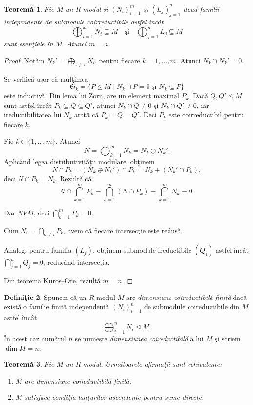 \documentclass[12pt,a4paper]{book}
\newcommand{\ess}{\trianglelefteq}  %
\theoremstyle{plain}
\newtheorem{theorem}{Teoremă}[section] %
\theoremstyle{definition}
\newtheorem{definition}[theorem]{Definiţie}
\theoremstyle{remark}
\begin{document}
\begin{theorem}
Fie \(M\) un \(R\)-modul şi \((N_i)_{i=1}^m\) şi \((L_j)_{j=1}^n\) două familii
independente de submodule coirreductibile astfel încât
\[
\bigoplus_{i=1}^m N_i \subseteq M
\quad\text{şi}\quad
\bigoplus_{j=1}^n L_j \subseteq M
\]
sunt esenţiale în \(M\).  
Atunci \(m = n\).
\end{theorem}

\begin{proof}
Notăm \(N_k' = \bigoplus_{i\ne k} N_i\), pentru fiecare \(k=1,\dots,m\).
Atunci \(N_k \cap N_k' = 0\).

Se verifică uşor că mulţimea
\[
\mathfrak{S}_k = \{P \le M \mid N_k \cap P = 0 \text{ şi } N_k \subseteq P\}
\]
este inductivă. Din lema lui Zorn, are un element maximal \(P_k\).
Dacă \(Q,Q' \le M\) sunt astfel încât \(P_k \subseteq Q \subseteq Q'\),
atunci \(N_k \cap Q \ne 0\) şi \(N_k \cap Q' \ne 0\),
iar ireductibilitatea lui \(N_k\) arată că \(P_k = Q = Q'\).
Deci \(P_k\) este coirreductibil pentru fiecare \(k\).

Fie \(k\in\{1,\dots,m\}\).
Atunci
\[
N = \bigoplus_{k=1}^m N_k = N_k \oplus N_k'.
\]
Aplicând legea distributivităţii modulare, obţinem
\[
N \cap P_k = (N_k \oplus N_k') \cap P_k
           = N_k + (N_k' \cap P_k),
\]
deci \(N \cap P_k = N_k\).
Rezultă că
\[
N \cap \bigcap_{k=1}^m P_k = \bigcap_{k=1}^m (N\cap P_k) = \bigcap_{k=1}^m N_k = 0.
\]

Dar \(NVM\), deci \(\bigcap_{k=1}^m P_k = 0\).

Cum \(N_i = \bigcap_{k\ne i} P_k\), avem că fiecare intersecţie este redusă.

Analog, pentru familia \((L_j)\), obţinem submodule ireductibile \((Q_j)\)
astfel încât \(\bigcap_{j=1}^n Q_j = 0\), reducând intersecţia.

Din teorema Kuros–Ore, rezultă \(m = n\).
\end{proof}


\begin{definition}
Spunem că un \(R\)-modul \(M\) are \emph{dimensiune coireductibilă finită} dacă
există o familie finită independentă \((N_i)_{i=1}^n\) de submodule
coireductibile din \(M\) astfel încât
\[
\bigoplus_{i=1}^n N_i \ess M.
\]
În acest caz numărul \(n\) se numeşte \emph{dimensiunea coireductibilă} a lui
\(M\) şi scriem \(\dim M = n\).
\end{definition}

\begin{theorem}
Fie \(M\) un \(R\)-modul. Următoarele afirmaţii sunt echivalente:
\begin{enumerate}
  \item \(M\) are dimensiune coireductibilă finită.
  \item \(M\) satisface condiţia lanţurilor ascendente pentru sume directe.
\end{enumerate}
\end{theorem}
\end{document}
